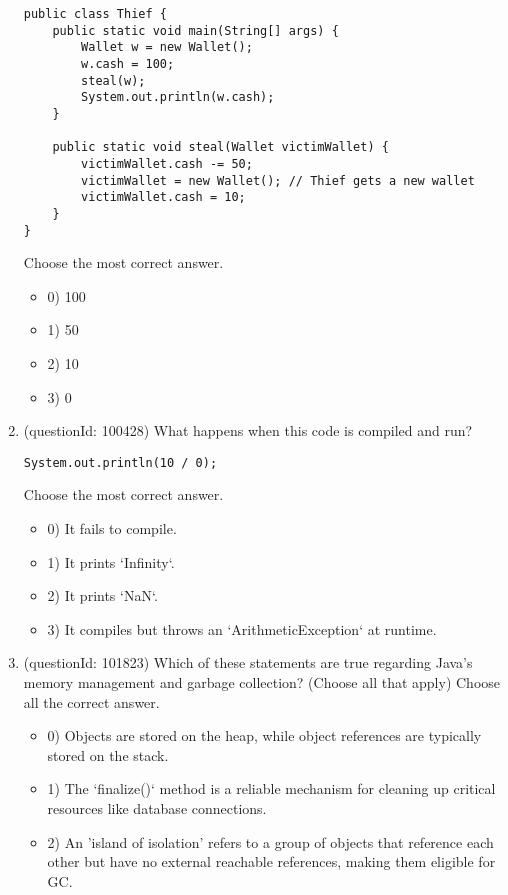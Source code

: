 \documentclass[12pt]{article}
\begin{document}
\begin{enumerate}[label=(\arabic*)]
\begin{verbatim}
public class Thief {
    public static void main(String[] args) {
        Wallet w = new Wallet();
        w.cash = 100;
        steal(w);
        System.out.println(w.cash);
    }

    public static void steal(Wallet victimWallet) {
        victimWallet.cash -= 50;
        victimWallet = new Wallet(); // Thief gets a new wallet
        victimWallet.cash = 10;
    }
}
\end{verbatim}
Choose the most correct answer. 
\begin{itemize}
\item 0) 100

\item 1) 50

\item 2) 10

\item 3) 0

\end{itemize}
\item (questionId: 100428) What happens when this code is compiled and run?
\begin{verbatim}
System.out.println(10 / 0);
\end{verbatim}
Choose the most correct answer. 
\begin{itemize}
\item 0) It fails to compile.

\item 1) It prints `Infinity`.

\item 2) It prints `NaN`.

\item 3) It compiles but throws an `ArithmeticException` at runtime.

\end{itemize}
\item (questionId: 101823) Which of these statements are true regarding Java's memory management and garbage collection? (Choose all that apply)
Choose all the correct answer.\begin{itemize}
\item 0) Objects are stored on the heap, while object references are typically stored on the stack.

\item 1) The `finalize()` method is a reliable mechanism for cleaning up critical resources like database connections.

\item 2) An 'island of isolation' refers to a group of objects that reference each other but have no external reachable references, making them eligible for GC.


\end{itemize}
\end{enumerate}
\end{document}
